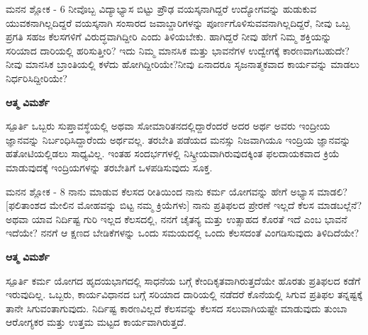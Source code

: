 \newpage
\begin{mananam}{\mananamfont ಮನನ ಶ್ಲೋಕ - \textenglish{6}}
\footnotesize \mananamtext ನೀವೊಬ್ಬ ವಿದ್ಯಾಭ್ಯಾಸ ಬಿಟ್ಟು ಪ್ರೌಢ ವಯಸ್ಕನಾಗಿದ್ದರೆ ಉದ್ಯೋಗವನ್ನು ಹುಡುಕುವ ಯುವಕನಾಗಿಲ್ಲದಿದ್ದರೆ ವಯಸ್ಕನಾಗಿ ಸಂಸಾರದ ಜವಾಬ್ದಾರಿಗಳನ್ನು ಪೂರ್ಣಗೊಳಿಸುವವನಾಗಿಲ್ಲದಿದ್ದರೆ, ನೀವು ಒಬ್ಬ ಪ್ರಗತಿ ಸಹಜ ಕೆಲಸಗಳಿಗೆ ವಿರುದ್ಧವಾಗಿದ್ದೀರಿ ಎಂದು ತಿಳಿಯಬೇಕು. ಹಾಗಿದ್ದರೆ ನೀವು ಹೇಗೆ ನಿಮ್ಮ ಶಕ್ತಿಯನ್ನು ಸರಿಯಾದ ದಾರಿಯಲ್ಲಿ ಹರಿಸುತ್ತೀರಿ? ಇದು ನಿಮ್ಮ ಮಾನಸಿಕ ಮತ್ತು ಭಾವನೆಗಳ ಉದ್ವೇಗಕ್ಕೆ ಕಾರಣವಾಗಬಹುದೇ? ನೀವು ಮಾನಸಿಕ ಬ್ರಾಂತಿಯಲ್ಲಿ ಕಳೆದು ಹೋಗಿದ್ದೀರಿಯೇ?ನೀವು ಏನಾದರೂ ಸೃಜನಾತ್ಮಕವಾದ
ಕಾರ್ಯವನ್ನು ಮಾಡಲು ನಿರ್ಧರಿಸಿದ್ದೀರಿಯೇ?
\end{mananam}
\WritingHand\enspace\textbf{ಆತ್ಮ ವಿಮರ್ಶೆ}\\
\begin{inspiration}{\mananamfont ಸ್ಪೂರ್ತಿ}
\footnotesize \mananamtext ಒಬ್ಬರು ಸುಪ್ತಾವಸ್ಥೆಯಲ್ಲಿ ಅಥವಾ ಸೋಮಾರಿತನದಲ್ಲಿದ್ದಾರೆಂದರೆ ಅದರ ಅರ್ಥ ಅವರು ಇಂದ್ರೀಯ ಜ್ಞಾನವನ್ನು ನಿರ್ಬಂಧಿಸಿದ್ದಾರೆಂದು ಅರ್ಥವಲ್ಲ. ತರಬೇತಿ ಪಡೆಯದ ಮನಸ್ಸು ನಿಜವಾಗಿಯೂ ಇಂದ್ರಿಯ ಜ್ಞಾನವನ್ನು ಹತೋಟಿಯಲ್ಲಿಡಲು ಸಾಧ್ಯವಿಲ್ಲ. ಇಂತಹ ಸಂದರ್ಭಗಳಲ್ಲಿ ನಿಸ್ಕ್ರೀಯವಾಗಿರುವುದಕ್ಕಿಂತ ಫಲದಾಯಕವಾದ ಕ್ರಿಯೆ ಮಾಡುವುದಕ್ಕೆ ಇಂದ್ರಿಯಗಳನ್ನು ತರಬೇತಿಗೆ ಒಳಪಡಿಸುವುದು ಸೂಕ್ತ.
\end{inspiration}
\newpage


\newpage
\begin{mananam}{\mananamfont ಮನನ ಶ್ಲೋಕ - \textenglish{8}}
\footnotesize \mananamtext ನಾನು ಮಾಡುವ ಕೆಲಸದ ರೀತಿಯಿಂದ ನಾನು ಕರ್ಮ ಯೋಗವನ್ನು ಹೇಗೆ ಅಭ್ಯಾಸ ಮಾಡಲಿ? [ಫಲಿತಾಂಶದ ಮೇಲಿನ ಮೋಹವನ್ನು ಬಿಟ್ಟ ನಮ್ಮ ಕ್ರಿಯೆಗಳು] ನಾನು ಪ್ರತಿಫಲದ ಪ್ರೇರಣೆ ಇಲ್ಲದೆ ಕೆಲಸ ಮಾಡಬಲ್ಲೆನೆ? ಅಥವಾ ಯಾವ ನಿರ್ದಿಷ್ಟ ಗುರಿ ಇಲ್ಲದ ಕೆಲಸದಲ್ಲಿ, ನನಗೆ ಚೈತನ್ಯ ಮತ್ತು ಉತ್ಸಾಹದ ಕೊರತೆ ಇದೆ ಎಂಬ ಭಾವನೆ ಇದೆಯೇ? ನನಗೆ ಆ ಕ್ಷಣದ ಬೇಡಿಕೆಗಳನ್ನು ಒಂದು ಸಮಯದಲ್ಲಿ ಒಂದು ಕೆಲಸದಂತೆ ವಿಂಗಡಿಸುವುದು ತಿಳಿದಿದೆಯೇ?
\end{mananam}
\WritingHand\enspace\textbf{ಆತ್ಮ ವಿಮರ್ಶೆ}\\
\begin{inspiration}{\mananamfont ಸ್ಪೂರ್ತಿ}
\footnotesize \mananamtext ಕರ್ಮ ಯೋಗದ ಹೃದಯಭಾಗದಲ್ಲಿ ಸಾಧನೆಯ ಬಗ್ಗೆ ಕೇಂದಿಕೃತವಾಗಿರುತ್ತದೆಯೇ ಹೊರತು ಪ್ರತಿಫಲದ ಕಡೆಗೆ ಇರುವುದಿಲ್ಲ. ಒಬ್ಬರು, ಕಾರ್ಯವಿಧಾನದ ಬಗ್ಗೆ ಸರಿಯಾದ ದಾರಿಯಲ್ಲಿ ನಡೆದರೆ ಕೊನೆಯಲ್ಲಿ ಸಿಗುವ ಪ್ರತಿಫಲ ತನ್ನಷ್ಟಕ್ಕೆ ತಾನೇ ಸಿಗುವಂತಾಗುವುದು. ನಿರ್ದಿಷ್ಟ ಕಾರಣವಿಲ್ಲದೆ ಕೆಲಸವನ್ನು ಕೆಲಸದ ಸಲುವಾಗಿಯಷ್ಟೇ ಮಾಡುವುದು ತುಂಬಾ ಆರೋಗ್ಯಕರ ಮತ್ತು ಉತ್ತಮ ಮಟ್ಟದ ಕಾರ್ಯವಾಗಿರುತ್ತದೆ.
\end{inspiration}
\newpage

